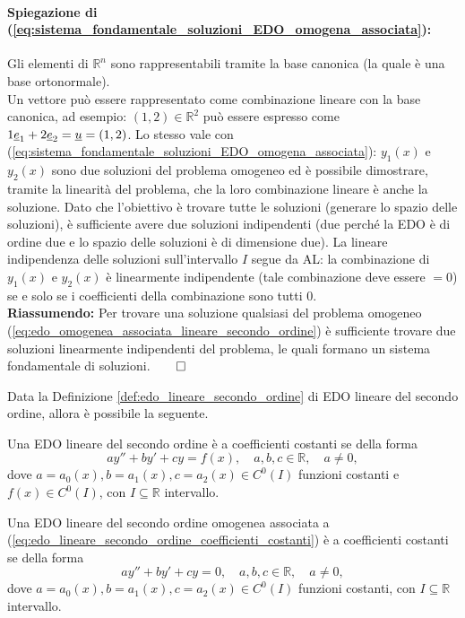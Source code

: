 \paragraph{Spiegazione di (\ref{eq:sistema_fondamentale_soluzioni_EDO_omogena_associata}):} Gli elementi di $\mathbb R^n$ sono rappresentabili tramite la base canonica (la quale è una \gls{base ortonormale}).\\
Un vettore può essere rappresentato come combinazione lineare con la base canonica, ad esempio: $(1,2)\in\mathbb R^2$ può essere espresso come $1\uline e_1 + 2\uline e_2=\uline u=(1,2)$. Lo stesso vale con (\ref{eq:sistema_fondamentale_soluzioni_EDO_omogena_associata}): $y_1(x)$ e $y_2(x)$ sono due soluzioni del problema omogeneo ed è possibile dimostrare, tramite la linearità del problema, che la loro combinazione lineare è anche la soluzione. Dato che l'obiettivo è trovare tutte le soluzioni (generare lo spazio delle soluzioni), è sufficiente avere due soluzioni indipendenti (due perché la EDO è di ordine due e lo spazio delle soluzioni è di dimensione due). La lineare indipendenza delle soluzioni sull'intervallo $I$ segue da AL:  la combinazione di $y_1(x)$ e $y_2(x)$ è linearmente indipendente (tale combinazione deve essere $=0$) se e solo se i coefficienti della combinazione sono tutti 0.\\
\textbf{Riassumendo:} Per trovare una soluzione qualsiasi del problema omogeneo (\ref{eq:edo_omogenea_associata_lineare_secondo_ordine}) è sufficiente trovare due soluzioni linearmente indipendenti del problema, le quali formano un sistema fondamentale di soluzioni.$\qed$

Data la Definizione \ref{def:edo_lineare_secondo_ordine} di EDO lineare del secondo ordine, allora è possibile la seguente.
\begin{definition}
	Una EDO lineare del secondo ordine è a coefficienti costanti se della forma
	\begin{equation}\label{eq:edo_lineare_secondo_ordine_coefficienti_costanti}
		a y'' + by' + cy =  f(x),\quad a,b,c\in\mathbb{R},\quad a\neq 0,
	\end{equation}
	dove $a=a_0(x), b=a_1(x), c=a_2(x)\in C^0(I)$ funzioni costanti e $f(x)\in C^0(I)$, con $I\subseteq\mathbb{R}$ intervallo.
\end{definition}

\begin{definition}
	Una EDO lineare del secondo ordine omogenea associata a (\ref{eq:edo_lineare_secondo_ordine_coefficienti_costanti}) è a coefficienti costanti se della forma
	\begin{equation}\label{eq:edo_lineare_secondo_ordine_omogenea_coefficienti_costanti}
		a y'' + by' + cy =  0,\quad a,b,c\in\mathbb{R},\quad a\neq 0,
	\end{equation}
	dove $a=a_0(x), b=a_1(x), c=a_2(x)\in C^0(I)$ funzioni costanti, con $I\subseteq\mathbb{R}$ intervallo.
\end{definition}

